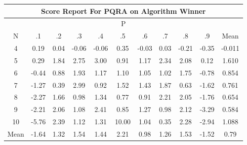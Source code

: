 \documentclass[11pt,a4paper]{report}
\begin{document}
\begin{longtable}{ | c || c | c | c | c | c | c | c | c | c || c |}
\hline
\multicolumn{11}{|c|}{ Score Report For PQRA on Algorithm Winner} \\
\hline
\multicolumn{11}{|c|}{ P } \\
\hline
N & .1 & .2 & .3 & .4 & .5 & .6 & .7 & .8 & .9 & Mean\\
 \hline
 \hline
 \endhead
  4 &  \cellcolor[HTML]{F7F7FF} 0.19 &  \cellcolor[HTML]{FFFFFF} 0.04 &  \cellcolor[HTML]{FFFFFF} -0.06 &  \cellcolor[HTML]{FFFFFF} -0.06 &  \cellcolor[HTML]{F7F7FF} 0.35 &  \cellcolor[HTML]{FFFFFF} -0.03 &  \cellcolor[HTML]{FFFFFF} 0.03 &  \cellcolor[HTML]{FFF7F7} -0.21 &  \cellcolor[HTML]{FFF7F7} -0.35 & -0.011 \\
  5 &  \cellcolor[HTML]{F7F7FF} 0.29 &  \cellcolor[HTML]{CFCFFF} 1.84 &  \cellcolor[HTML]{B7B7FF} 2.75 &  \cellcolor[HTML]{B7B7FF} 3.00 &  \cellcolor[HTML]{E7E7FF} 0.91 &  \cellcolor[HTML]{DFDFFF} 1.17 &  \cellcolor[HTML]{C7C7FF} 2.34 &  \cellcolor[HTML]{C7C7FF} 2.08 &  \cellcolor[HTML]{FFFFFF} 0.12 & 1.610 \\
  6 &  \cellcolor[HTML]{FFF7F7} -0.44 &  \cellcolor[HTML]{E7E7FF} 0.88 &  \cellcolor[HTML]{CFCFFF} 1.93 &  \cellcolor[HTML]{DFDFFF} 1.17 &  \cellcolor[HTML]{E7E7FF} 1.10 &  \cellcolor[HTML]{E7E7FF} 1.05 &  \cellcolor[HTML]{E7E7FF} 1.02 &  \cellcolor[HTML]{CFCFFF} 1.75 &  \cellcolor[HTML]{FFEFEF} -0.78 & 0.854 \\
  7 &  \cellcolor[HTML]{FFDFDF} -1.27 &  \cellcolor[HTML]{F7F7FF} 0.39 &  \cellcolor[HTML]{B7B7FF} 2.99 &  \cellcolor[HTML]{E7E7FF} 0.92 &  \cellcolor[HTML]{D7D7FF} 1.52 &  \cellcolor[HTML]{DFDFFF} 1.43 &  \cellcolor[HTML]{CFCFFF} 1.87 &  \cellcolor[HTML]{EFEFFF} 0.63 &  \cellcolor[HTML]{FFD7D7} -1.62 & 0.761 \\
  8 &  \cellcolor[HTML]{FFC7C7} -2.27 &  \cellcolor[HTML]{D7D7FF} 1.66 &  \cellcolor[HTML]{E7E7FF} 0.98 &  \cellcolor[HTML]{DFDFFF} 1.34 &  \cellcolor[HTML]{EFEFFF} 0.77 &  \cellcolor[HTML]{E7E7FF} 0.91 &  \cellcolor[HTML]{C7C7FF} 2.21 &  \cellcolor[HTML]{CFCFFF} 2.05 &  \cellcolor[HTML]{FFCFCF} -1.76 & 0.654 \\
  9 &  \cellcolor[HTML]{FFC7C7} -2.21 &  \cellcolor[HTML]{CFCFFF} 2.06 &  \cellcolor[HTML]{E7E7FF} 1.08 &  \cellcolor[HTML]{BFBFFF} 2.41 &  \cellcolor[HTML]{E7E7FF} 0.85 &  \cellcolor[HTML]{DFDFFF} 1.27 &  \cellcolor[HTML]{E7E7FF} 0.98 &  \cellcolor[HTML]{C7C7FF} 2.12 &  \cellcolor[HTML]{FFAFAF} -3.29 & 0.584 \\
  10 &  \cellcolor[HTML]{FF7070} -5.76 &  \cellcolor[HTML]{BFBFFF} 2.39 &  \cellcolor[HTML]{DFDFFF} 1.12 &  \cellcolor[HTML]{DFDFFF} 1.31 &  \cellcolor[HTML]{0808FF} 10.00 &  \cellcolor[HTML]{E7E7FF} 1.04 &  \cellcolor[HTML]{F7F7FF} 0.35 &  \cellcolor[HTML]{C7C7FF} 2.28 &  \cellcolor[HTML]{FFB7B7} -2.94 & 1.088 \\
 \hline
 \hline
Mean &  \cellcolor[HTML]{FFD7D7} -1.64 &  \cellcolor[HTML]{DFDFFF} 1.32 &  \cellcolor[HTML]{D7D7FF} 1.54 &  \cellcolor[HTML]{D7D7FF} 1.44 &  \cellcolor[HTML]{C7C7FF} 2.21 &  \cellcolor[HTML]{E7E7FF} 0.98 &  \cellcolor[HTML]{DFDFFF} 1.26 &  \cellcolor[HTML]{D7D7FF} 1.53 &  \cellcolor[HTML]{FFD7D7} -1.52 &  \cellcolor[HTML]{EFEFFF} 0.79
\end{longtable}
\end{document}
